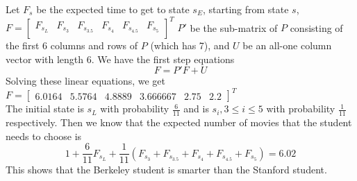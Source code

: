 \begin{enumerate}[label=\alph*)]
\begin{solution}[9cm]
Let $F_s$ be the expected time to get to state $s_E$, starting from 
state $s$,
$F = 
\begin{bmatrix}
F_{s_L} & F_{s_3} & F_{s_{3.5}} & F_{s_4} & F_{s_{4.5}} & F_{s_5} \\
\end{bmatrix}^T$
$P'$ be the sub-matrix of $P$ consisting of the first 6 columns and rows 
of $P$ (which has 7), and $U$ be an all-one column vector with length 6. 
We have the first step equations 
\begin{equation*}
F = P'F + U
\end{equation*}
Solving these linear equations, we get \\
$F = 
\begin{bmatrix}
6.0164 & 5.5764 & 4.8889 & 3.666667 & 2.75 & 2.2 
\end{bmatrix}^T$ \\
The initial state is $s_L$ with probability $\frac{6}{11}$ and is 
$s_i, 3 \leq i \leq 5$ with probability $\frac{1}{11}$ respectively. 
Then we know that the expected number of movies that the student 
needs to choose is 
\begin{equation*}
1 + \frac{6}{11}F_{s_L} + \frac{1}{11}(F_{s_3} + F_{s_{3.5}} + F_{s_4} 
+ F_{s_{4.5}} + F_{s_5}) = 6.02
\end{equation*}
This shows that the Berkeley student is smarter than the Stanford student.
\end{solution}

\end{enumerate}